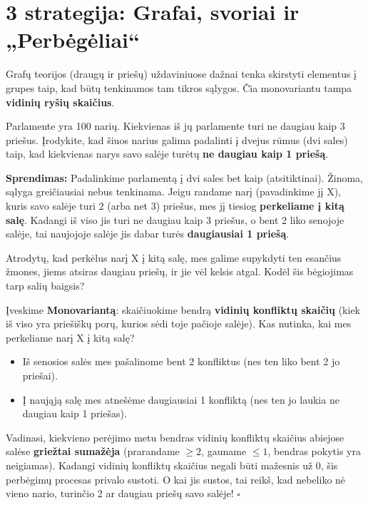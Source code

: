 \documentclass[11pt,a4paper]{scrartcl}
\newenvironment{solution}
    {\begin{list}{}{\setlength{\leftmargin}{10pt}\setlength{\rightmargin}{10pt}}\item[]}
    {\end{list}}
\begin{document}
\section{3 strategija: Grafai, svoriai ir „Perbėgėliai“}

Grafų teorijos (draugų ir priešų) uždaviniuose dažnai tenka skirstyti elementus į grupes taip, kad būtų tenkinamos tam tikros sąlygos. Čia monovariantu tampa \textbf{vidinių ryšių skaičius}.

\begin{example}
Parlamente yra 100 narių. Kiekvienas iš jų parlamente turi ne daugiau kaip 3 priešus. Įrodykite, kad šiuos narius galima padalinti į dvejus rūmus (dvi sales) taip, kad kiekvienas narys savo salėje turėtų \textbf{ne daugiau kaip 1 priešą}.
\end{example}

\begin{solution}
\textbf{Sprendimas:}
Padalinkime parlamentą į dvi sales bet kaip (atsitiktinai). Žinoma, sąlyga greičiausiai nebus tenkinama. 
Jeigu randame narį (pavadinkime jį X), kuris savo salėje turi 2 (arba net 3) priešus, mes jį tiesiog \textbf{perkeliame į kitą salę}. 
Kadangi iš viso jis turi ne daugiau kaip 3 priešus, o bent 2 liko senojoje salėje, tai naujojoje salėje jis dabar turės \textbf{daugiausiai 1 priešą}.

Atrodytų, kad perkėlus narį X į kitą salę, mes galime supykdyti ten esančius žmones, jiems atsiras daugiau priešų, ir jie vėl kelsis atgal. Kodėl šis bėgiojimas tarp salių baigsis?

Įveskime \textbf{Monovariantą}: skaičiuokime bendrą \textbf{vidinių konfliktų skaičių} (kiek iš viso yra priešiškų porų, kurios sėdi toje pačioje salėje).
Kas nutinka, kai mes perkeliame narį X į kitą salę?
\begin{itemize}
    \item Iš senosios salės mes pašalinome bent 2 konfliktus (nes ten liko bent 2 jo priešai).
    \item Į naująją salę mes atnešėme daugiausiai 1 konfliktą (nes ten jo laukia ne daugiau kaip 1 priešas).
\end{itemize}
Vadinasi, kiekvieno perėjimo metu bendras vidinių konfliktų skaičius abiejose salėse \textbf{griežtai sumažėja} (prarandame $\ge 2$, gauname $\le 1$, bendras pokytis yra neigiamas).
Kadangi vidinių konfliktų skaičius negali būti mažesnis už 0, šis perbėgimų procesas privalo sustoti. O kai jis sustos, tai reikš, kad nebeliko nė vieno nario, turinčio 2 ar daugiau priešų savo salėje! \hfill $\square$
\end{solution}
\end{document}
